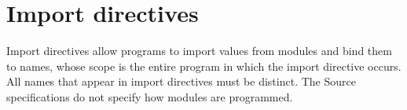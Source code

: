 \section*{Import directives}

Import directives allow programs to import values from modules and bind them to names, whose scope
is the entire program in which the import directive occurs. All names that appear in import directives
must be distinct. The Source specifications do not specify how modules are programmed.
